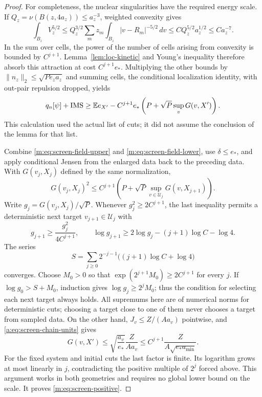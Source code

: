 \begin{proof}
For completeness, the nuclear singularities have the required energy
scale.  If $Q_z=\nu(B(z,4a_z))\le a_z^{-3}$, weighted convexity gives
\begin{equation}\label{m:eq:screen-nuclear-power}
 \int_{B_z}V_z^{5/2}
 \le Q_z^{3/2}\sum_m z_m
       \int_{B_z}|v-R_m|^{-5/2}\,dv
 \le C Q_z^{5/2}a_z^{1/2}\le Ca_z^{-7}.
\end{equation}
In the sum over cells, the power of the number of cells arising from
convexity is bounded by $C^{j+1}$.  Lemma~\ref{lem:loc-kinetic} and
Young's inequality therefore absorb this attraction at cost
$C^{j+1}e_*$.  Multiplying the other bounds by
$\|n_z\|_2\le\sqrt{Pe_za_z}$ and summing cells, the conditional
localization identity, with out-pair repulsion dropped, yields
\begin{equation}\label{m:eq:screen-field-lower}
 q_n[\psi]+\mathrm{IMS}
 \ge\mathbb E e_{X'}-C^{j+1}e_*
           \left(P+\sqrt P\sup_vG(v,X')\right).
\end{equation}
This calculation used the actual list of cuts; it did not assume the
conclusion of the lemma for that list.

Combine \eqref{m:eq:screen-field-upper} and
\eqref{m:eq:screen-field-lower}, use $\delta\le e_*$, and apply conditional
Jensen from the enlarged data back to the preceding data.  With
$G(v_j,X_j)$ defined by the same normalization,
\begin{equation}\label{a:eq:screen-recursion}
 G(v_j,X_j)^2\le C^{j+1}
       \left(P+\sqrt P\sup_{v\in\mathcal U_j}G(v,X_{j+1})\right).
\end{equation}
Write $g_j=G(v_j,X_j)/\sqrt P$.  Whenever $g_j^2\ge2C^{j+1}$,
the last inequality permits a deterministic next target
$v_{j+1}\in\mathcal U_j$ with
\[
 g_{j+1}\ge\frac{g_j^2}{4C^{j+1}},\qquad
 \log g_{j+1}\ge2\log g_j-(j+1)\log C-\log4.
\]
The series
\[
 S=\sum_{j\ge0}2^{-j-1}\big((j+1)\log C+\log4\big)
\]
converges.  Choose $M_0>0$ so that
$\exp(2^{j+1}M_0)\ge2C^{j+1}$ for every $j$.  If
$\log g_0>S+M_0$, induction gives $\log g_j\ge2^jM_0$;
thus the condition for selecting each next target always holds.
All supremums here are of numerical norms for deterministic cuts;
choosing a target close to one of them never chooses a target from
sampled data.  On the other hand, $J_v\le Z/(Aa_v)$ pointwise, and
\eqref{a:eq:screen-chain-units} gives
\[
 G(v,X')\le\sqrt{\frac{a_v}{e_*}}\frac{Z}{Aa_v}
 \le C^{j+1}\frac{Z}{A\sqrt{e_*a_{\min}}}.
\]
For the fixed system and initial cuts the last factor is finite.
Its logarithm grows at most linearly in $j$, contradicting the
positive multiple of $2^j$ forced above.  This argument works in
both geometries and requires no global lower bound on the scale.
It proves \eqref{m:eq:screen-positive}.
\end{proof}

